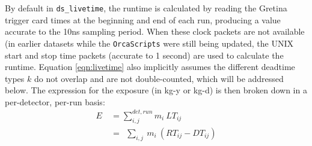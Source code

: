 \documentclass[notitlepage,rmp,aps,10pt]{revtex4-1}
\newcommand{\tty}{\texttt}
\begin{document}
By default in \tty{ds\_livetime}, the runtime is calculated by reading the Gretina trigger card times at the beginning and end of each run, producing a value accurate to the 10ns sampling period.  When these clock packets are not available (in earlier datasets while the \texttt{OrcaScripts} were still being updated, the UNIX start and stop time packets (accurate to 1 second) are used to calculate the runtime.
Equation \ref{eqn:livetime} also implicitly assumes the different deadtime types $k$ do not overlap and are not double-counted, which will be addressed below.  The expression for the exposure (in kg-y or kg-d) is then broken down in a per-detector, per-run basis:
\begin{equation} \label{eqn:exposure}
\begin{split}
  E\ & = \sum_{i,j}^{det,run} m_i\ LT_{ij} \\
    & =\ \ \sum_{i,j}\ m_i\ (RT_{ij} - DT_{ij})
\end{split}
\end{equation}
\end{document}
